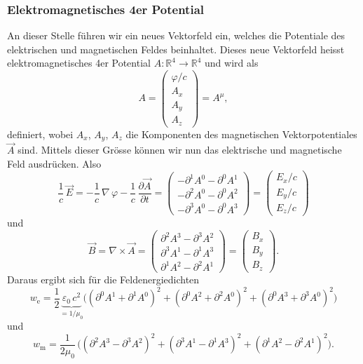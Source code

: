\subsubsection{Elektromagnetisches 4er Potential}
An dieser Stelle führen wir ein neues Vektorfeld ein, welches die Potentiale des elektrischen und magnetischen Feldes beinhaltet.
Dieses neue Vektorfeld heisst elektromagnetisches 4er Potential
\(
A:\mathbb{R}^4 \rightarrow \mathbb{R}^4
\)
und wird als
\begin{equation}
	A
	=
	\begin{pmatrix}
		\varphi / c\\
		A_x\\
		A_y\\
		A_z
	\end{pmatrix}
	=
	A^{\mu},
\end{equation}
definiert, wobei $A_x$, $A_y$, $A_z$ die Komponenten des magnetischen Vektorpotentiales $\vec{A}$ sind.
Mittels dieser Grösse können wir nun das elektrische und magnetische Feld ausdrücken.
Also
\begin{equation}
\frac{1}{c}\, \vec{E}
=
-\frac{1}{c}\, \nabla\,\varphi - \frac{1}{c}\,\frac{\partial \vec{A}}{\partial t}
=
\begin{pmatrix}
	-\partial^1 A^0 - \partial^0 A^1\\
	-\partial^2 A^0 - \partial^0 A^2\\
	-\partial^3 A^0 - \partial^0 A^3
\end{pmatrix}
=
\begin{pmatrix}
	E_x / c\\
	E_y / c\\
	E_z / c
\end{pmatrix}
\end{equation}
und
\begin{equation}
\vec{B}
=
\nabla \times \vec{A}
=
\begin{pmatrix}
	\partial^2 A^3 - \partial^3 A^2\\
	\partial^3 A^1 - \partial^1 A^3\\
	\partial^1 A^2 - \partial^2 A^1
\end{pmatrix}
=
\begin{pmatrix}
	B_x\\
	B_y\\
	B_z
\end{pmatrix}.
\end{equation}
Daraus ergibt sich für die Feldenergiedichten
\[
w_{\text{e}}
=
\frac{1}{2}\underbrace{\varepsilon_0\,c^2}_{\displaystyle=1/\mu_0} \biggl(\left(\partial^0 A^1 + \partial^1 A^0\right)^2 + \left(\partial^0 A^2 + \partial^2 A^0\right)^2 + 
\left(\partial^0 A^3 + \partial^3 A^0\right)^2\biggr)
\]
und 
\[
w_{\text{m}}
=
\frac{1}{2\mu_0}\,\biggl(\left(\partial^2 A^3 - \partial^3 A^2\right)^2 + \left(\partial^3 A^1 - \partial^1 A^3\right)^2 + 
\left(\partial^1 A^2 - \partial^2 A^1\right)^2\biggr).
\]

